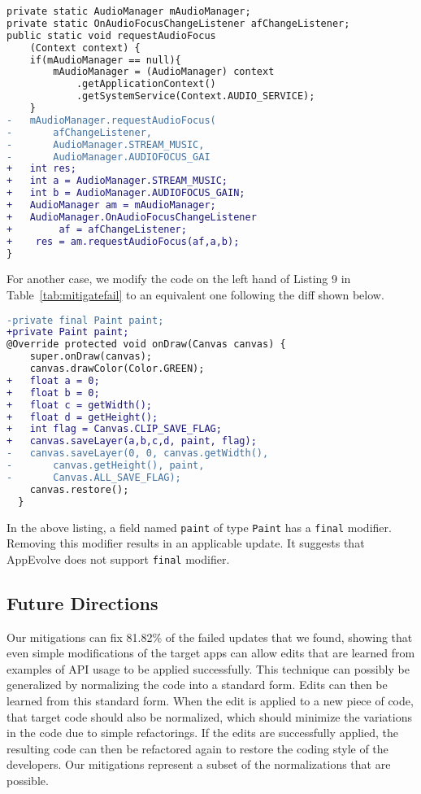 \vspace{0.5cm}\begin{lstlisting}[language=diff,numbers=none]
private static AudioManager mAudioManager;
private static OnAudioFocusChangeListener afChangeListener;
public static void requestAudioFocus
    (Context context) {
    if(mAudioManager == null){
        mAudioManager = (AudioManager) context
            .getApplicationContext()
            .getSystemService(Context.AUDIO_SERVICE);
    }
-   mAudioManager.requestAudioFocus(
-       afChangeListener,
-       AudioManager.STREAM_MUSIC,
-       AudioManager.AUDIOFOCUS_GAI
+   int res;
+   int a = AudioManager.STREAM_MUSIC;
+   int b = AudioManager.AUDIOFOCUS_GAIN;
+   AudioManager am = mAudioManager;
+   AudioManager.OnAudioFocusChangeListener
+        af = afChangeListener;
+    res = am.requestAudioFocus(af,a,b);
}
\end{lstlisting}


\vspace{0.5cm} For another case, we modify the code on the left hand of Listing 9 in Table~\ref{tab:mitigatefail} to an equivalent one following the diff shown below.

\vspace{0.5cm}\begin{lstlisting}[language=diff,numbers=none]
-private final Paint paint;
+private Paint paint;
@Override protected void onDraw(Canvas canvas) {
    super.onDraw(canvas);
    canvas.drawColor(Color.GREEN);
+   float a = 0;
+   float b = 0;
+   float c = getWidth();
+   float d = getHeight();
+   int flag = Canvas.CLIP_SAVE_FLAG;
+   canvas.saveLayer(a,b,c,d, paint, flag);
-   canvas.saveLayer(0, 0, canvas.getWidth(),
-       canvas.getHeight(), paint,
-       Canvas.ALL_SAVE_FLAG);
    canvas.restore();
  }
\end{lstlisting}

\vspace{0.5cm}In the above listing, a field named {\tt paint} of type {\tt Paint} has a {\tt final} modifier. Removing this modifier results in an applicable update. It suggests that AppEvolve does not support {\tt final} modifier.


\subsection{Future Directions}

Our mitigations can fix 81.82\% of the failed updates that we found,
showing that even simple modifications of the target apps can allow
edits that are learned from examples of API usage to be applied
successfully. This technique can possibly be generalized by normalizing the
code into a standard form. Edits can then be learned from this standard
form. When the edit is applied to a new piece of code, that target code
should also be normalized, which should minimize the variations in the code
due to simple refactorings. If the edits are successfully applied, the
resulting code can then be refactored again to restore the coding
style of the developers.  Our mitigations represent a subset of the normalizations that are
possible.

